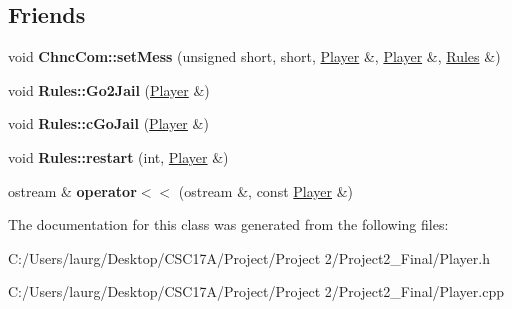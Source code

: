 \subsection*{Friends}
\begin{DoxyCompactItemize}
\item 
\mbox{\label{class_player_ae6db878679688c4d56ae2e97c86c6725}} 
void {\bfseries Chnc\+Com\+::set\+Mess} (unsigned short, short, \hyperlink{class_player}{Player} \&, \hyperlink{class_player}{Player} \&, \hyperlink{class_rules}{Rules} \&)
\item 
\mbox{\label{class_player_aa34775e5581bc3473f4da48e27e0aff6}} 
void {\bfseries Rules\+::\+Go2\+Jail} (\hyperlink{class_player}{Player} \&)
\item 
\mbox{\label{class_player_ad64d486925f00c04d73ee000fd856b37}} 
void {\bfseries Rules\+::c\+Go\+Jail} (\hyperlink{class_player}{Player} \&)
\item 
\mbox{\label{class_player_a45bcb466a41cb86f9ee8ebfba7a1b1d4}} 
void {\bfseries Rules\+::restart} (int, \hyperlink{class_player}{Player} \&)
\item 
\mbox{\label{class_player_a17ae887e285346988c33e45f9b9d9389}} 
ostream \& {\bfseries operator$<$$<$} (ostream \&, const \hyperlink{class_player}{Player} \&)
\end{DoxyCompactItemize}


The documentation for this class was generated from the following files\+:\begin{DoxyCompactItemize}
\item 
C\+:/\+Users/laurg/\+Desktop/\+C\+S\+C17\+A/\+Project/\+Project 2/\+Project2\+\_\+\+Final/Player.\+h\item 
C\+:/\+Users/laurg/\+Desktop/\+C\+S\+C17\+A/\+Project/\+Project 2/\+Project2\+\_\+\+Final/Player.\+cpp\end{DoxyCompactItemize}
